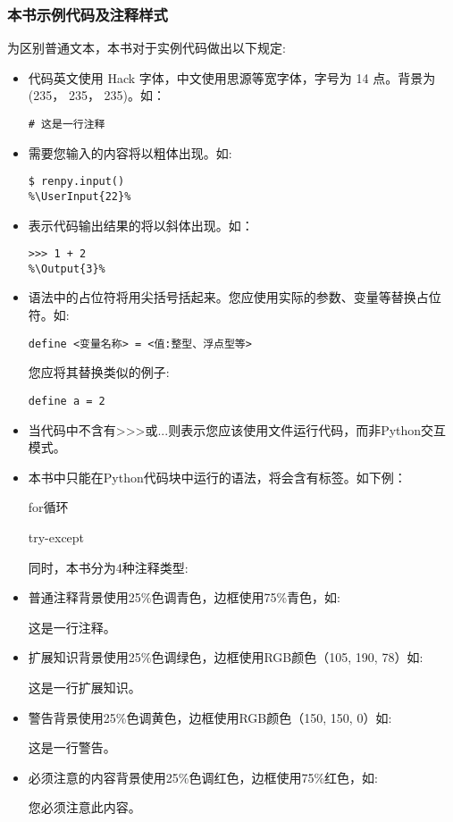 \subsubsection*{本书示例代码及注释样式}
为区别普通文本，本书对于实例代码做出以下规定:
\begin{itemize}
    \item 代码英文使用 Hack 字体，中文使用思源等宽字体，字号为 14 点。背景为 (235， 235， 235)。如：
    \begin{lstlisting}[numbers=none]
# 这是一行注释
    \end{lstlisting}

    \item 需要您输入的内容将以粗体出现。如:
    \begin{lstlisting}
$ renpy.input()
%\UserInput{22}%
    \end{lstlisting}

    \item 表示代码输出结果的将以斜体出现。如：
    \begin{lstlisting}
>>> 1 + 2
%\Output{3}%
    \end{lstlisting}

    \item 语法中的占位符将用尖括号括起来。您应使用实际的参数、变量等替换占位符。如:
    \begin{lstlisting}[numbers=none]
define <变量名称> = <值:整型、浮点型等>
    \end{lstlisting}
    您应将其替换类似的例子:
    \begin{lstlisting}[numbers=none]
define a = 2
    \end{lstlisting}

    \item 当代码中不含有>>>或...则表示您应该使用文件运行代码，而非Python交互模式。

    \item 本书中只能在Python代码块中运行的语法，将会含有\PyOnly 标签。如下例：


    for循环 \PyOnly
    
    try-except \PyOnly


    同时，本书分为4种注释类型:
    \item 普通注释背景使用25\%色调青色，边框使用75\%青色，如:
    \begin{Comment}
这是一行注释。
    \end{Comment}
    \item 扩展知识背景使用25\%色调绿色，边框使用RGB颜色（105, 190, 78）如:
    \begin{ExtraKnowledge}
    这是一行扩展知识。
    \end{ExtraKnowledge}
    \item 警告背景使用25\%色调黄色，边框使用RGB颜色（150, 150, 0）如:
    \begin{Warning}
    这是一行警告。
    \end{Warning}
    \item 必须注意的内容背景使用25\%色调红色，边框使用75\%红色，如:
    \begin{Attention}
    您必须注意此内容。
    \end{Attention}
\end{itemize}

